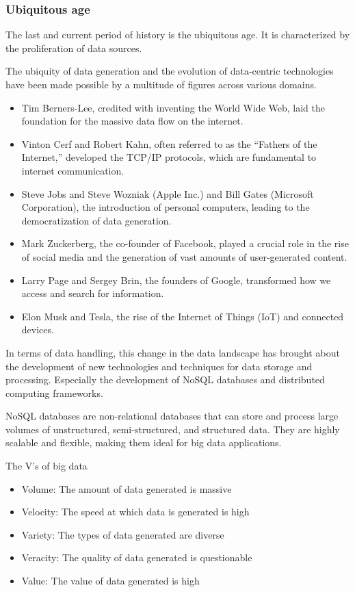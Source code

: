 \subsubsection{Ubiquitous age}

The last and current period of history is the ubiquitous age.  It is characterized by the
proliferation of data sources.

The ubiquity of data generation and the evolution of data-centric technologies have been
made possible by a multitude of figures across various domains.

\begin{itemize}
  \item Tim Berners-Lee, credited with inventing the World Wide Web, laid the foundation
    for the massive data flow on the internet.
  \item Vinton Cerf and Robert Kahn, often referred to as the ``Fathers of the Internet,''
    developed the TCP/IP protocols, which are fundamental to internet communication.
  \item Steve Jobs and Steve Wozniak (Apple Inc.) and Bill Gates (Microsoft Corporation),
    the introduction of personal computers, leading to the democratization of data
    generation.
  \item Mark Zuckerberg, the co-founder of Facebook, played a crucial role in the rise of
    social media and the generation of vast amounts of user-generated content.
  \item Larry Page and Sergey Brin, the founders of Google, transformed how we access and
    search for information.
  \item Elon Musk and Tesla, the rise of the Internet of Things (IoT) and connected
    devices.
\end{itemize}

In terms of data handling, this change in the data landscape has brought about the
development of new technologies and techniques for data storage and processing.  Especially
the development of NoSQL databases and distributed computing frameworks.

NoSQL databases are non-relational databases that can store and process large volumes of
unstructured, semi-structured, and structured data.  They are highly scalable and
flexible, making them ideal for big data applications.

\begin{slidebox}{The V's of big data}{}
  \begin{itemize}
    \item Volume: The amount of data generated is massive
    \item Velocity: The speed at which data is generated is high
    \item Variety: The types of data generated are diverse
    \item Veracity: The quality of data generated is questionable
    \item Value: The value of data generated is high
  \end{itemize}
\end{slidebox}

